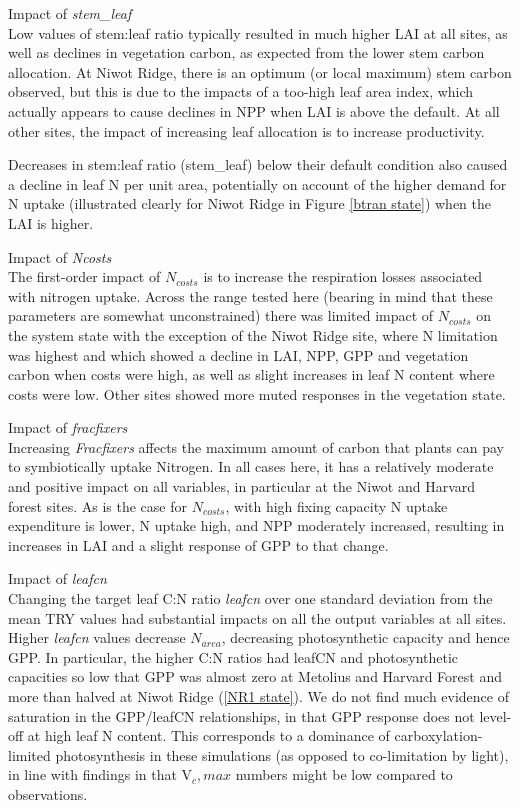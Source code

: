 \documentclass[draft,linenumbers]{agujournal}
\begin{document}
Impact of \emph{stem\_leaf}\\
Low values of stem:leaf ratio typically resulted in much higher LAI at all sites, as well as declines in vegetation carbon, as expected from the lower stem carbon allocation. At Niwot Ridge, there is an optimum (or local maximum) stem carbon observed, but this is due to the impacts of a too-high leaf area index, which actually appears to cause declines in NPP when LAI is above the default. At all other sites, the impact of increasing leaf allocation is to increase productivity. 

Decreases in stem:leaf ratio (stem\_leaf) below their default condition also caused a decline in leaf N per unit area, potentially on account of the higher demand for N uptake (illustrated clearly for Niwot Ridge in Figure \ref{btran state}) when the LAI is higher. 

Impact of \emph{Ncosts}\\
The first-order impact of $N_{costs}$ is to increase the respiration losses associated with nitrogen uptake.  Across the range tested here (bearing in mind that these parameters are somewhat unconstrained) there was limited impact of $N_{costs}$ on the system state with the exception of the Niwot Ridge site, where N limitation was highest and which showed a decline in LAI, NPP, GPP and vegetation carbon when costs were high, as well as slight increases in leaf N content where costs were low. Other sites showed more muted responses in the vegetation state. 

Impact of \emph{fracfixers}\\
Increasing \emph{Fracfixers} affects the maximum amount of carbon that plants can pay to symbiotically uptake Nitrogen. In all cases here, it has a relatively moderate and positive impact on all variables, in particular at the Niwot and Harvard forest sites. As is the case for $N_{costs}$, with high fixing capacity N uptake expenditure is lower, N uptake high, and NPP moderately increased, resulting in increases in LAI and a slight response of GPP to that change. 

Impact of \emph{leafcn}\\
Changing the target leaf C:N ratio \emph{leafcn} over one standard deviation from the mean TRY values had substantial impacts on all the output variables at all sites. Higher \emph{leafcn} values decrease $N_{area}$, decreasing photosynthetic capacity and hence GPP.  In particular, the higher C:N ratios had leafCN and photosynthetic capacities so low that GPP was almost zero at Metolius and Harvard Forest and more than halved at Niwot Ridge (\ref{NR1 state}).    We do not find much evidence of saturation in the GPP/leafCN relationships, in that GPP response does not level-off at high leaf N content. This corresponds to a dominance of carboxylation-limited photosynthesis in these simulations (as opposed to co-limitation by light), in line with findings in \cite{lawrence} that V${_c,max}$ numbers might be low compared to observations. 
\end{document}
